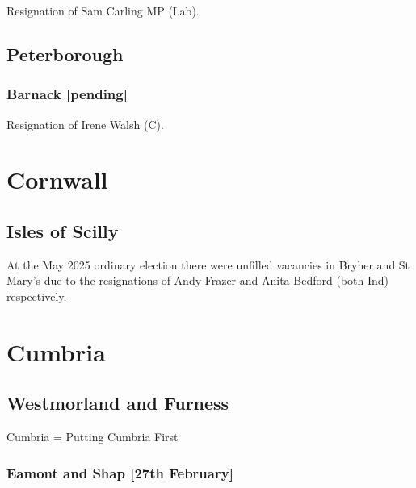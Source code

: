 \documentclass[a4paper,openany]{book}
\begin{document}
\begin{resultsiii}

Resignation of Sam Carling MP (Lab).

\subsection*{Peterborough}

\subsubsection*{Barnack \hspace*{\fill}\nolinebreak[1]%
	\enspace\hspace*{\fill}
	[pending]}


Resignation of Irene Walsh (C).

\section{Cornwall}

\subsection*{Isles of Scilly}

At the May 2025 ordinary election there were unfilled vacancies in Bryher and St Mary's due to the resignations of Andy Frazer and Anita Bedford (both Ind) respectively.%

\section{Cumbria}

\subsection*{Westmorland and Furness}

Cumbria = Putting Cumbria First

\subsubsection*{Eamont and Shap \hspace*{\fill}\nolinebreak[1]%
	\enspace\hspace*{\fill}
	[27th February]}


\end{resultsiii}
\end{document}
